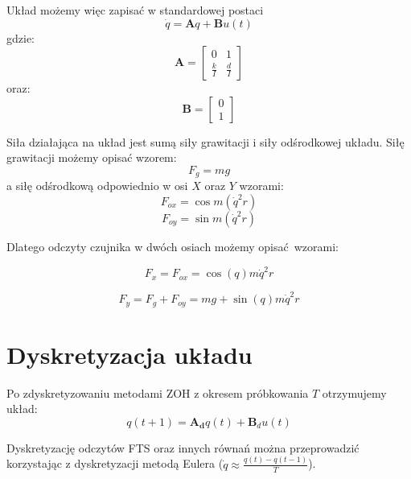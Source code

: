 \documentclass[a4paper, 10pt]{article}
\begin{document}
Układ możemy więc zapisać w standardowej postaci
\begin{equation}
\dot{q} = \textbf{A}q + \textbf{B}u(t)
\end{equation}
gdzie:
\begin{equation}
\mathbf{A} = 	\begin{bmatrix}
	    0 & 1 \\
	    \frac{k}{I} & \frac{d}{I}
	\end{bmatrix}
\end{equation}
oraz:
\begin{equation}
\mathbf{B} = \begin{bmatrix}
	    0 \\
	    1
	\end{bmatrix}
\end{equation}

Siła działająca na układ jest sumą siły grawitacji i siły odśrodkowej układu.
Siłę grawitacji możemy opisać wzorem:
\begin{equation}
F_g = mg
\end{equation}
a siłę odśrodkową odpowiednio w osi $X$ oraz $Y$ wzorami:
\begin{equation}
F_{ox} =  \cos{m(\dot{q}^2 r)}
\end{equation}
\begin{equation}
F_{oy} =  \sin{m(\dot{q}^2 r)}
\end{equation}


Dlatego odczyty czujnika w dwóch osiach możemy opisać wzorami:

\begin{equation}
F_x = F_{ox} = \cos{(q)}m\dot{q}^2 r
\end{equation}

\begin{equation}
\label{eq:fy}
F_y = F_g + F_{oy} = mg + \sin{(q)}m\dot{q}^2 r
\end{equation}


\section{Dyskretyzacja układu}
Po zdyskretyzowaniu metodami ZOH z okresem próbkowania $T$ otrzymujemy układ:
\begin{equation}
q(t+1) = \mathbf{A_d}q(t) + \mathbf{B}_du(t)
\label{eq:dyskretny}
\end{equation}

Dyskretyzację odczytów FTS  oraz innych równań można przeprowadzić korzystając z dyskretyzacji metodą Eulera ($\dot{q} \approx \frac{q(t)-q(t-1)}{T}$). 
\end{document}
